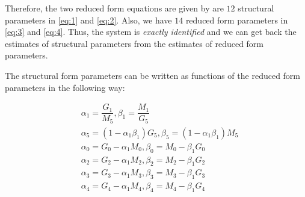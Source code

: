 \documentclass[12pt, a4paper]{article}
\begin{document}
Therefore, the two reduced form equations are given by
\color{black}{There} are $12$ structural parameters in \eqref{eq:1} and \eqref{eq:2}. Also, we have $14$ reduced form parameters in \eqref{eq:3} and \eqref{eq:4}. Thus, the system is \textit{exactly identified} and we can get back the estimates of structural parameters from the estimates of reduced form parameters. 

The structural form parameters can be written as functions of the reduced form parameters in the following way:

\begin{align*}
    & \alpha_{1}=\dfrac{G_{1}}{M_{5}}, \beta_{1}=\dfrac{M_{1}}{G_{5}}\\
    & \alpha_{5}=(1-\alpha_{1}\beta_{1})G_{5}, \beta_{5}=(1-\alpha_{1}\beta_{1})M_{5}\\
    & \alpha_{0}=G_{0}-\alpha_{1}M_{0}, \beta_{0}=M_{0}-\beta_{1}G_{0}\\
    & \alpha_{2}=G_{2}-\alpha_{1}M_{2}, \beta_{2}=M_{2}-\beta_{1}G_{2}\\
    & \alpha_{3}=G_{3}-\alpha_{1}M_{3}, \beta_{3}=M_{3}-\beta_{1}G_{3}\\
    & \alpha_{4}=G_{4}-\alpha_{1}M_{4}, \beta_{4}=M_{4}-\beta_{1}G_{4}
\end{align*}
\end{document}

